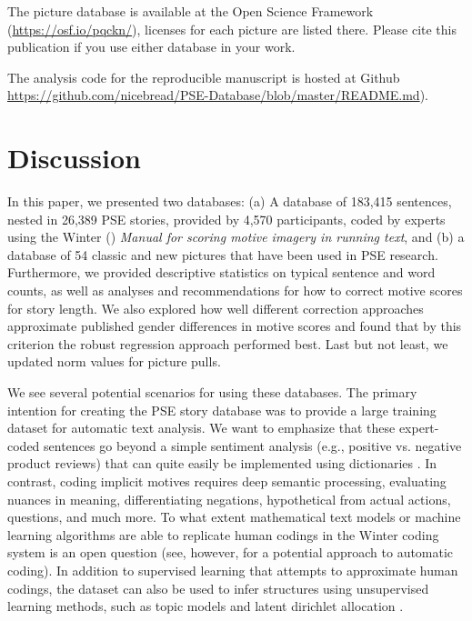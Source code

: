 \documentclass[jou,a4paper]{apa6}\usepackage[]{graphicx}\usepackage[]{color}
\begin{document}
The picture database is available at the Open Science Framework (\url{https://osf.io/pqckn/}), licenses for each picture are listed there. Please cite this publication if you use either database in your work.

The analysis code for the reproducible manuscript is hosted at Github \url{https://github.com/nicebread/PSE-Database/blob/master/README.md}). 


\section{Discussion}

In this paper, we presented two databases: (a) A database of 183,415 sentences, nested in 26,389 PSE stories, provided by 4,570 participants, coded by experts using the Winter (\citeyear{winter_ManualScoringMotive_1994}) \emph{Manual for scoring motive imagery in running text}, and (b) a database of 54 classic and new pictures that have been used in PSE research. Furthermore, we provided descriptive statistics on typical sentence and word counts, as well as analyses and recommendations for how to correct motive scores for story length. 
We also explored how well different correction approaches approximate published gender differences in motive scores and found that by this criterion the robust regression approach performed best.
Last but not least, we updated norm values for picture pulls.

We see several potential scenarios for using these databases. The primary intention for creating the PSE story database was to provide a large training dataset for automatic text analysis. We want to emphasize that these expert-coded sentences go beyond a simple sentiment analysis (e.g., positive vs. negative product reviews) that can quite easily be implemented using dictionaries \parencite[e.g.,][]{feldman_TechniquesApplicationsSentiment_2013}. In contrast, coding implicit motives requires deep semantic processing, evaluating nuances in meaning, differentiating negations, hypothetical from actual actions, questions, and much more. To what extent mathematical text models or machine learning algorithms are able to replicate human codings in the Winter coding system is an open question (see, however,  for a potential approach to automatic coding). In addition to supervised learning that attempts to approximate human codings, the dataset can also be used to infer structures using unsupervised learning methods, such as topic models and latent dirichlet allocation \parencite{blei_LatentDirichletAllocation_2003}.
\end{document}
